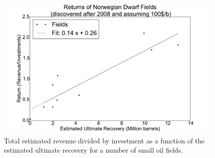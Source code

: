 \documentclass[review]{elsarticle}
\begin{document}
\begin{figure}[H]
\includegraphics[width=1\columnwidth]{no-returns-size}
\caption{Total estimated revenue divided by investment as a function of the estimated 
ultimate recovery for a number of small oil fields. }
\label{returnNorwayfield}
\end{figure}
\end{document}
